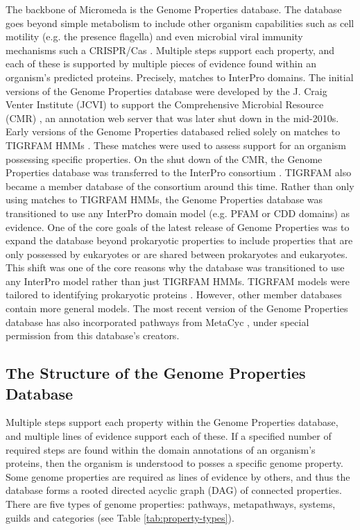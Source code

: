 The backbone of Micromeda is the Genome Properties \cite{Haft2013} database. The database goes beyond simple metabolism to include other organism capabilities such as cell motility (e.g. the presence flagella) and even microbial viral immunity mechanisms such a CRISPR/Cas \cite{horvath2010crispr}. Multiple steps support each property, and each of these is supported by multiple pieces of evidence found within an organism's predicted proteins. Precisely, matches to InterPro domains. The initial versions of the Genome Properties database were developed by the J. Craig Venter Institute (JCVI) to support the Comprehensive Microbial Resource (CMR) \cite{Davidsen2010}, an annotation web server that was later shut down in the mid-2010s. Early versions of the Genome Properties databased relied solely on matches to TIGRFAM HMMs \cite{Haft2013, Novere2009}. These matches were used to assess support for an organism possessing specific properties. On the shut down of the CMR, the Genome Properties database was transferred \cite{finn2018} to the InterPro consortium \cite{Hunter2009}. TIGRFAM also became a member database of the consortium around this time. Rather than only using matches to TIGRFAM HMMs, the Genome Properties database was transitioned to use any InterPro domain model (e.g. PFAM or CDD domains) as evidence. One of the core goals of the latest release of Genome Properties was to expand the database beyond prokaryotic properties to include properties that are only possessed by eukaryotes or are shared between prokaryotes and eukaryotes. This shift was one of the core reasons why the database was transitioned to use any InterPro model rather than just TIGRFAM HMMs. TIGRFAM models were tailored to identifying prokaryotic proteins \cite{Haft2013}. However, other member databases contain more general models. The most recent version of the Genome Properties database has also incorporated pathways from MetaCyc \cite{karp2002metacyc}, under special permission from this database's creators.


\subsection{The Structure of the Genome Properties Database}

Multiple steps support each property within the Genome Properties database, and multiple lines of evidence support each of these. If a specified number of required steps are found within the domain annotations of an organism's proteins, then the organism is understood to posses a specific genome property. Some genome properties are required as lines of evidence by others, and thus the database forms a rooted directed acyclic graph (DAG) of connected properties. There are five types of genome properties: pathways, metapathways, systems, guilds and categories (see Table \ref{tab:property-types}). 

